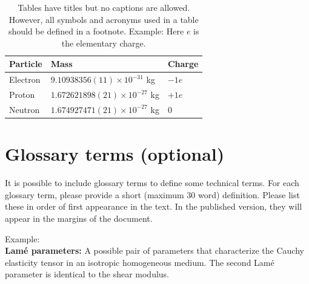 \documentclass[fleqn,11pt]{wlscirep}
\begin{document}
\begin{table}[ht]
\centering
\begin{tabular}{|l|l|l|}
\hline
Particle & Mass & Charge \\
\hline
Electron & $9.10938356(11)\times10^{-31}$ kg & $-1e$ \\
\hline
Proton & $1.672621898(21)\times10^{-27}$ kg & $+1e$ \\
\hline
Neutron & $1.674927471(21)\times10^{-27}$ kg & $0$ \\
\hline
\end{tabular}
\caption{\label{tab}Tables have titles but no captions are allowed. However, all symbols and acronyms used in a table should be defined in a footnote. Example: Here $e$ is the elementary charge.}
\end{table}

\section*{Glossary terms (optional)}
It is possible  to include glossary terms to define some technical terms. For each glossary term, please provide a short (maximum 30 word) definition. Please list these in order of first appearance in the text. In the published version, they will appear in the margins of the document. 

Example: \\
\textbf{Lam\'e parameters:} A possible pair of parameters that characterize the Cauchy elasticity tensor in an isotropic homogeneous medium. The second Lam\'e parameter is identical to the shear modulus.
\end{document}
